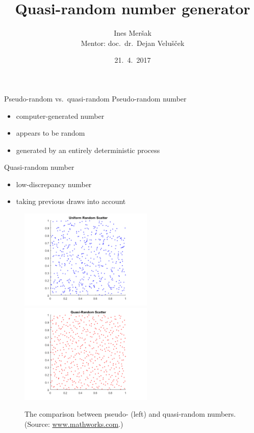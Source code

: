\documentclass[11pt]{beamer}
\title{Quasi-random number generator}
\author[Ines Meršak]{Ines Meršak \\
    Mentor: doc.~dr.~Dejan Velušček}
\date{21.~4.~2017}
\begin{document}
\begin{frame}
    \maketitle
\end{frame}

\begin{frame}{Pseudo-random vs.~quasi-random}
    \alert{Pseudo-random number} 
    \begin{itemize}
        \item computer-generated number
        \item appears to be random
        \item generated by an entirely deterministic process
    \end{itemize}

    \bigskip
    
    \bigskip
    
    \alert{Quasi-random number}
    \begin{itemize}
        \item low-discrepancy number
        \item taking previous draws into account
    \end{itemize}
\end{frame}

\begin{frame}
    \begin{figure}
        \includegraphics[width=180pt]{pseudo.png}
        \includegraphics[width=180pt]{quasi.png}
    \caption{The comparison between pseudo- (left) and quasi-random numbers. (Source: \url{www.mathworks.com}.)}
    \end{figure}
\end{frame}
\end{document}
